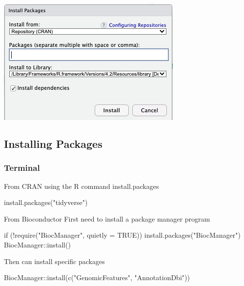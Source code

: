 \documentclass[
  letterpaper,
  DIV=11,
  numbers=noendperiod,
  landscape]{scrartcl}
\newenvironment{Shaded}{\begin{snugshade}}{\end{snugshade}}
\newcommand{\AttributeTok}[1]{\textcolor[rgb]{0.40,0.45,0.13}{#1}}
\newcommand{\ConstantTok}[1]{\textcolor[rgb]{0.56,0.35,0.01}{#1}}
\newcommand{\ControlFlowTok}[1]{\textcolor[rgb]{0.00,0.23,0.31}{#1}}
\newcommand{\FunctionTok}[1]{\textcolor[rgb]{0.28,0.35,0.67}{#1}}
\newcommand{\NormalTok}[1]{\textcolor[rgb]{0.00,0.23,0.31}{#1}}
\newcommand{\SpecialCharTok}[1]{\textcolor[rgb]{0.37,0.37,0.37}{#1}}
\newcommand{\StringTok}[1]{\textcolor[rgb]{0.13,0.47,0.30}{#1}}
\begin{document}
\includegraphics[width=3.60417in,height=2.47917in]{images/RStudio_package_installer.png}

\hypertarget{installing-packages}{%
\subsection{Installing Packages}\label{installing-packages}}

\hypertarget{terminal}{%
\subsubsection{Terminal}\label{terminal}}

From CRAN using the R command install.packages

\begin{Shaded}
\begin{Highlighting}[]
\FunctionTok{install.packages}\NormalTok{(}\StringTok{"tidyverse"}\NormalTok{)}
\end{Highlighting}
\end{Shaded}

From Bioconductor First need to install a package manager program

\begin{Shaded}
\begin{Highlighting}[]
\ControlFlowTok{if}\NormalTok{ (}\SpecialCharTok{!}\FunctionTok{require}\NormalTok{(}\StringTok{"BiocManager"}\NormalTok{, }\AttributeTok{quietly =} \ConstantTok{TRUE}\NormalTok{))}
    \FunctionTok{install.packages}\NormalTok{(}\StringTok{"BiocManager"}\NormalTok{)}
\NormalTok{BiocManager}\SpecialCharTok{::}\FunctionTok{install}\NormalTok{()}
\end{Highlighting}
\end{Shaded}

Then can install specific packages

\begin{Shaded}
\begin{Highlighting}[]
\NormalTok{BiocManager}\SpecialCharTok{::}\FunctionTok{install}\NormalTok{(}\FunctionTok{c}\NormalTok{(}\StringTok{"GenomicFeatures"}\NormalTok{, }\StringTok{"AnnotationDbi"}\NormalTok{))}
\end{Highlighting}
\end{Shaded}
\end{document}
